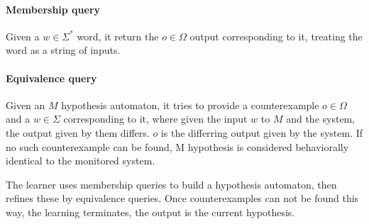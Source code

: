 \paragraph{Membership query} Given a $w\in\Sigma^{*}$ word, it return the $o\in \Omega$ output corresponding to it, treating the word as a string of inputs.

\paragraph{Equivalence query} Given an $M$ hypothesis automaton, it tries to provide a counterexample $o\in\Omega$ and a $w\in\Sigma$ corresponding to it, where given the input $w$ to $M$ and the system, the output given by them differs. $o$ is the differring output given by the system. If no such counterexample can be found, M hypothesis is considered behaviorally identical to the monitored system.

\noindent The learner uses membership queries to build a hypothesis automaton, then refines these by equivalence queries. Once counterexamples can not be found this way, the learning terminates, the output is the current hypothesis.


